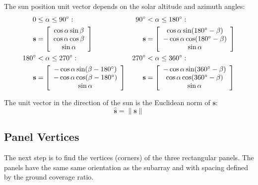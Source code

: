 \documentclass[12pt,letterpaper]{article}
\begin{document}
The sun position unit vector depends on the solar altitude and azimuth angles:
\begin{align}
0 & \leq \alpha \leq 90\degree:
&90^\circ&<\alpha\leq180^\circ:
\notag\\
\mathbf{s} &= 
  \left [
    \begin{array}{c}
      \cos\alpha\sin\beta\\
      \cos\alpha\cos\beta\\
      \sin\alpha\\
    \end{array}
  \right]
&\mathbf{s} &= 
  \left [
    \begin{array}{c}
      \cos\alpha\sin(180^\circ-\beta)\\
      -\cos\alpha\cos(180^\circ-\beta)\\
      \sin\alpha\\
    \end{array}
  \right]
\notag\\
180^\circ&<\alpha\leq270^\circ: 
&270^\circ&<\alpha\leq360^\circ: 
\notag\\
\mathbf{s} &= 
  \left [
    \begin{array}{c}
      -\cos\alpha\sin(\beta-180^\circ)\\
      -\cos\alpha\cos(\beta-180^\circ)\\
      \sin\alpha\\
    \end{array}
  \right]
&\mathbf{s} &= 
  \left [
    \begin{array}{c}
      -\cos\alpha\sin(360^\circ-\beta)\\
      \cos\alpha\cos(360^\circ-\beta)\\
      \sin\alpha\\
    \end{array}
  \right]
\end{align}

The unit vector in the direction of the sun is the Euclidean norm of $\mathbf{s}$:
\begin{equation}
\mathbf{\hat s} = \|\mathbf{s}\|
\end{equation}

\subsection{Panel Vertices}

The next step is to find the vertices (corners) of the three rectangular panels. The panels have the same same orientation as the subarray and with spacing defined by the ground coverage ratio.
\end{document}
